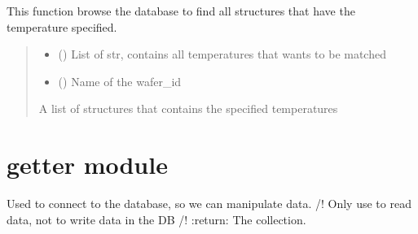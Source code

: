 \documentclass[letterpaper,10pt,english]{sphinxmanual}
\begin{document}
\begin{fulllineitems}
\label{\detokenize{filter:filter.filter_by_temp}}
\pysigstartsignatures
{}
\pysigstopsignatures
\sphinxAtStartPar
This function browse the database to find all structures that have the temperature specified.
\begin{quote}\begin{description}
\begin{itemize}
\item {} 
\sphinxAtStartPar
{} () \textendash{} List of str, contains all temperatures that wants to be matched

\item {} 
\sphinxAtStartPar
{} () \textendash{} Name of the wafer\_id

\end{itemize}

\sphinxAtStartPar
A list of structures that contains the specified temperatures

\end{description}\end{quote}

\end{fulllineitems}


\sphinxstepscope


\chapter{getter module}
\label{\detokenize{getter:module-getter}}\label{\detokenize{getter:getter-module}}\label{\detokenize{getter::doc}}

\begin{fulllineitems}
\label{\detokenize{getter:getter.connexion}}
\pysigstartsignatures
{}
\pysigstopsignatures
\sphinxAtStartPar
Used to connect to the database, so we can manipulate data. /! Only use to read data, not to write data in the DB /!
:return: The collection.

\end{fulllineitems}
\end{document}
